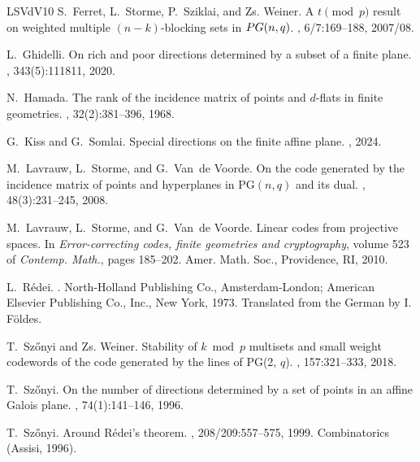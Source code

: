 \documentclass[12pt, a4paper]{article}
\theoremstyle{definition}
\begin{document}
\begin{thebibliography}{LSVdV10}
S.~Ferret, L.~Storme, P.~Sziklai, and {Zs.} Weiner.
\newblock A {$t\pmod{p}$} result on weighted multiple {$(n-k)$}-blocking sets in {${\rm PG}(n,q)$}.
, 6/7:169--188, 2007/08.

L.~Ghidelli.
\newblock On rich and poor directions determined by a subset of a finite plane.
, 343(5):111811, 2020.

N.~Hamada.
\newblock The rank of the incidence matrix of points and $ d $-flats in finite geometries.
, 32(2):381--396, 1968.

G.~Kiss and G.~Somlai.
\newblock Special directions on the finite affine plane.
, 2024.

M.~Lavrauw, L.~Storme, and G.~Van~de Voorde.
\newblock On the code generated by the incidence matrix of points and hyperplanes in {PG$(n,q)$} and its dual.
, 48(3):231--245, 2008.

M.~Lavrauw, L.~Storme, and G.~Van~de Voorde.
\newblock Linear codes from projective spaces.
\newblock In {\em Error-correcting codes, finite geometries and cryptography}, volume 523 of {\em Contemp. Math.}, pages 185--202. Amer. Math. Soc., Providence, RI, 2010.

L.~R{\'e}dei.
.
\newblock North-Holland Publishing Co., Amsterdam-London; American Elsevier Publishing Co., Inc., New York, 1973.
\newblock Translated from the German by I. F\"oldes.

T.~Sz\H{o}nyi and {Zs}. Weiner.
\newblock Stability of {$k\bmod p$} multisets and small weight codewords of the code generated by the lines of {PG}(2, {$q$}).
, 157:321--333, 2018.

T.~Sz{\H o}nyi.
\newblock On the number of directions determined by a set of points in an affine {G}alois plane.
, 74(1):141--146, 1996.

T.~Sz{\H o}nyi.
\newblock Around {R}\'edei's theorem.
, 208/209:557--575, 1999.
\newblock Combinatorics (Assisi, 1996).

\end{thebibliography}
\end{document}
